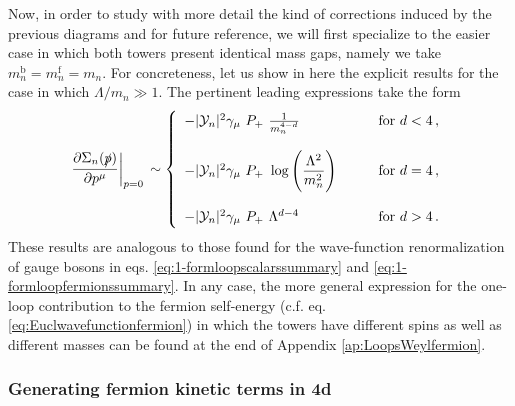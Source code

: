 Now, in order to study with more detail the kind of corrections induced by the previous diagrams and for future reference, we will first specialize to the easier case in which both towers present identical mass gaps, namely we take $m_n^{{\text{b}}} = m_n^{{\text{f}}} = m_n$. For concreteness, let us show in here the explicit results for the case in which $\Lambda/m_n \gg 1$. The pertinent leading expressions take the form
%
\begin{equation}\label{eq:fermionloopsummary}
		\frac{\partial \Sigma_n(\slashed{p})}{\partial p^{\mu}} \bigg\rvert_{p=0}\,   \sim 
		\left\{\begin{array}{lr}
			-|\mathcal{Y}_n|^2 \gamma_{\mu}\ P_{+}\ \frac{1}{m_n^{4-d}} & \qquad\text{for } d< 4\, ,\\ \\ 
			-|\mathcal{Y}_n|^2 \gamma_{\mu}\ P_{+}\ \log\left( \dfrac{\Lambda^2}{m_n^2}\right) &\qquad \text{for } d= 4\, ,\\ \\ 
			-|\mathcal{Y}_n|^2 \gamma_{\mu}\ P_{+}\ \Lambda^{d-4}&\qquad \text{for } d>4\, .
		\end{array}\right.
\end{equation}
%
These results are analogous to those found for the wave-function renormalization of gauge bosons in eqs. \eqref{eq:1-formloopscalarssummary} and \eqref{eq:1-formloopfermionssummary}. In any case, the more general expression for the one-loop contribution to the fermion self-energy (c.f. eq. \eqref{eq:Euclwavefunctionfermion}) in which the towers have different spins as well as different masses can be found at the end of Appendix \ref{ap:LoopsWeylfermion}.
	
\subsubsection{Generating fermion kinetic terms in 4d }
\label{sss:emergencefermion}
		
